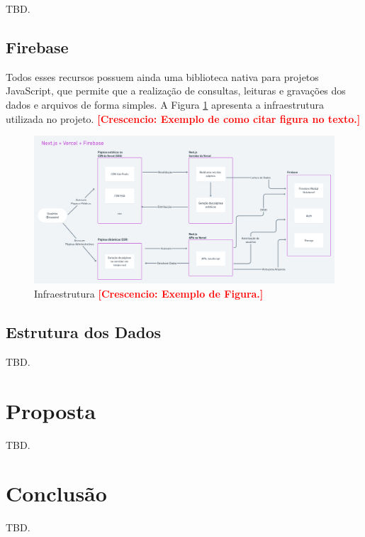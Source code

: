 \documentclass[12pt]{article}
\newcommand{\cl}[1]{\textcolor{red}{\textbf{[Crescencio: #1]}}}
\begin{document}
TBD.

\subsection{Firebase}



Todos esses recursos possuem ainda uma biblioteca nativa para projetos JavaScript, que permite que a realização de consultas, leituras e gravações dos dados e arquivos de forma simples. A Figura \ref{fig:infra1} apresenta a infraestrutura utilizada no projeto. \cl{Exemplo de como citar figura no texto.}



\begin{figure}[ht]
\centering
\includegraphics[width=1\textwidth]{imagens/infra.png}
\caption{Infraestrutura \cl{Exemplo de Figura.}}
\label{fig:infra1}
\end{figure}



\subsection{Estrutura dos Dados}

TBD.

\section{Proposta} \label{sec:proposta}

TBD.

\section{Conclusão} \label{sec:conclusao}

TBD.



\end{document}
